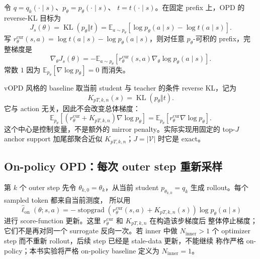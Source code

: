 \documentclass[lang=cn,scheme=chinese,openany]{../book/elegantbook}
\newcommand{\sg}{\operatorname{stopgrad}}
\begin{document}
令 $q=q_k(\cdot\mid s)$、$p_\theta=p_\theta(\cdot\mid s)$、 $t=t(\cdot\mid s)$。在固定 prefix 上，OPD 的 reverse-KL 目标为
\begin{equation}
\label{eq:ch2-opd-baseline-objective}
J_s(\theta)=\operatorname{KL}(p_\theta\Vert t)
 =\mathbb E_{a\sim p_\theta}
 \left[\log p_\theta(a\mid s)-\log t(a\mid s)\right].
\end{equation}
写 $r_\theta^{\mathrm{cur}}(s,a)=\log t(a\mid s)-\log p_\theta(a\mid s)$，则对任意 $p_\theta$-可积的 prefix，完整梯度是
\begin{equation}
\label{eq:ch2-opd-baseline-gradient}
\nabla_\theta J_s(\theta)
 =-\mathbb E_{a\sim p_\theta}
 \left[r_\theta^{\mathrm{cur}}(s,a)\nabla_\theta\log p_\theta(a\mid s)\right].
\end{equation}
常数 $1$ 因为 $\mathbb E_{p_\theta}[\nabla\log p_\theta]=0$ 而消失。

vOPD 风格的 baseline 取当前 student 与 teacher 的条件 reverse KL，记为
\begin{equation}
\label{eq:ch2-opd-vopd-center}
 K_{pT,k,n}(s)=\operatorname{KL}(p_\theta\Vert t).
\end{equation}
它与 action 无关，因此不会改变总体梯度：
\begin{equation}
\mathbb E_{p_\theta}[(r_\theta^{\mathrm{cur}}+K_{pT,k,n})\nabla\log p_\theta]
 =\mathbb E_{p_\theta}[r_\theta^{\mathrm{cur}}\nabla\log p_\theta].
\end{equation}
这个中心是控制变量，不是额外的 mirror penalty。实际实现用固定的 top-$J$ anchor support 加尾部聚合近似 $K_{pT,k,n}$；$J=|\mathcal V|$ 时它是 exact。

\subsection{On-policy OPD：每次 outer step 重新采样}
\label{subsec:ch2-opd-onpolicy-baseline}

第 $k$ 个 outer step 先令 $\theta_{k,0}=\theta_k$，从当前 student $p_{\theta_{k,0}}=q_k$ 生成 rollout。每个 sampled token 都来自当前测度， 所以用
\begin{equation}
\widehat\ell_{\mathrm{on}}(\theta;s,a)
 =-\sg\!\left(r_\theta^{\mathrm{cur}}(s,a)+K_{pT,k,n}(s)\right)
 \log p_\theta(a\mid s)
\end{equation}
进行 score-function 更新。这里 $r_\theta^{\mathrm{cur}}$ 和 $K_{pT,k,n}$ 在构造该步梯度后 整体停止梯度；它们不是再对同一个 surrogate 反向一次。若 inner 中做 $N_{\mathrm{inner}}>1$ 个 optimizer step 而不重新 rollout，后续 step 已经是 stale-data 更新，不能继续 称作严格 on-policy；本书实验将严格 on-policy baseline 定义为 $N_{\mathrm{inner}}=1$。
\end{document}
